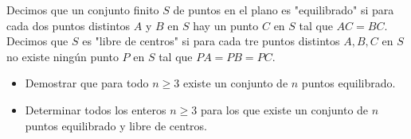 Decimos que un conjunto finito $S$ de puntos en el plano es "equilibrado" si para cada dos puntos distintos $A$ y $B$ en $S$ hay un punto $C$ en $S$ tal que $AC=BC$. Decimos que $S$ es "libre de centros" si para cada tre puntos distintos $A,B,C$ en $S$ no existe ningún punto $P$ en $S$ tal que $PA=PB=PC$. 
\begin{itemize}
\item Demostrar que para todo $n\ge 3$ existe un conjunto de $n$ puntos equilibrado. \newline 
\item Determinar todos los enteros $n\ge 3$ para los que existe un conjunto de $n$ puntos equilibrado y libre de centros.
\end{itemize}